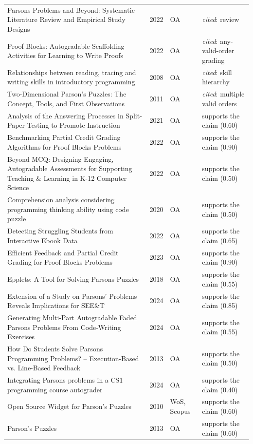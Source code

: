 \begin{longtable}{@{}%
  >{\raggedright\arraybackslash}p{}c%
  >{\raggedright\arraybackslash}p{}%
  >{\raggedright\arraybackslash}p{}@{}}
Parsons Problems and Beyond: Systematic Literature Review and Empirical Study Designs & 2022 & OA & \emph{cited}: review \\
Proof Blocks: Autogradable Scaffolding Activities for Learning to Write Proofs & 2022 & OA & \emph{cited}: any-valid-order grading \\
Relationships between reading, tracing and writing skills in introductory programming & 2008 & OA & \emph{cited}: skill hierarchy \\
Two-Dimensional Parson's Puzzles: The Concept, Tools, and First Observations & 2011 & OA & \emph{cited}: multiple valid orders \\
Analysis of the Answering Processes in Split-Paper Testing to Promote Instruction & 2021 & OA & supports the claim (0.60) \\
Benchmarking Partial Credit Grading Algorithms for Proof Blocks Problems & 2022 & OA & supports the claim (0.90) \\
Beyond MCQ: Designing Engaging, Autogradable Assessments for Supporting Teaching \& Learning in K-12 Computer Science & 2022 & OA & supports the claim (0.50) \\
Comprehension analysis considering programming thinking ability using code puzzle & 2020 & OA & supports the claim (0.50) \\
Detecting Struggling Students from Interactive Ebook Data & 2022 & OA & supports the claim (0.65) \\
Efficient Feedback and Partial Credit Grading for Proof Blocks Problems & 2023 & OA & supports the claim (0.90) \\
Epplets: A Tool for Solving Parsons Puzzles & 2018 & OA & supports the claim (0.55) \\
Extension of a Study on Parsons' Problems Reveals Implications for SEE\&T & 2024 & OA & supports the claim (0.85) \\
Generating Multi-Part Autogradable Faded Parsons Problems From Code-Writing Exercises & 2024 & OA & supports the claim (0.55) \\
How Do Students Solve Parsons Programming Problems? -- Execution-Based vs. Line-Based Feedback & 2013 & OA & supports the claim (0.50) \\
Integrating Parsons problems in a CS1 programming course autograder & 2024 & OA & supports the claim (0.40) \\
Open Source Widget for Parson's Puzzles & 2010 & WoS, Scopus & supports the claim (0.60) \\
Parson's Puzzles & 2013 & OA & supports the claim (0.60) \\

\end{longtable}
